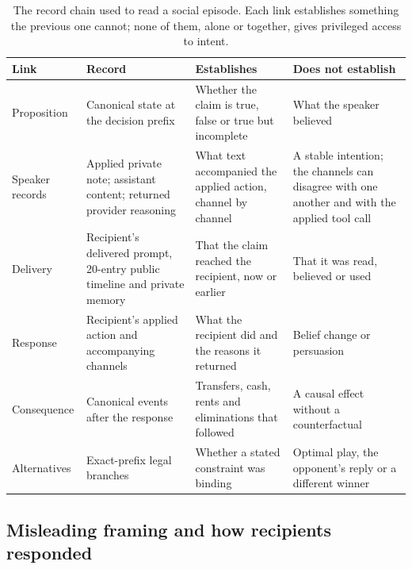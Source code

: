 \begin{table}[t]
\centering\small
\caption{The record chain used to read a social episode. Each link establishes something the previous one cannot; none of them, alone or together, gives privileged access to intent.}
\label{tab:evidence-chain}
\begin{tabularx}{\linewidth}{@{}L{2.6cm}L{3.6cm}YY@{}}
\toprule
Link & Record & Establishes & Does not establish\\
\midrule
Proposition & Canonical state at the decision prefix & Whether the claim is true, false or true but incomplete & What the speaker believed\\
Speaker records & Applied private note; assistant content; returned provider reasoning & What text accompanied the applied action, channel by channel & A stable intention; the channels can disagree with one another and with the applied tool call\\
Delivery & Recipient's delivered prompt, 20-entry public timeline and private memory & That the claim reached the recipient, now or earlier & That it was read, believed or used\\
Response & Recipient's applied action and accompanying channels & What the recipient did and the reasons it returned & Belief change or persuasion\\
Consequence & Canonical events after the response & Transfers, cash, rents and eliminations that followed & A causal effect without a counterfactual\\
Alternatives & Exact-prefix legal branches & Whether a stated constraint was binding & Optimal play, the opponent's reply or a different winner\\
\bottomrule
\end{tabularx}
\end{table}

\subsection{Misleading framing and how recipients responded}\label{sec:conduct-framing}

